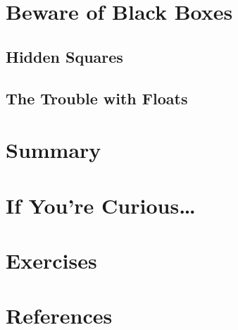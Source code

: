 \section{Beware of Black Boxes}
\subsection{Hidden Squares}
\subsection{The Trouble with Floats}
\section{Summary}
\section{If You’re Curious…}
\section{Exercises}
\section{References}





